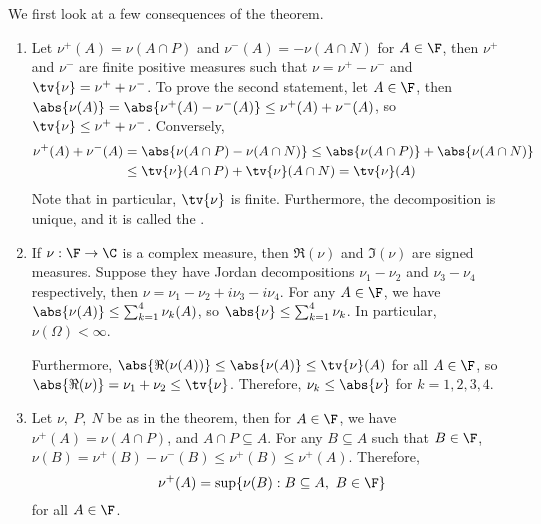 \documentclass[a4paper]{article}
\begin{document}
\begin{remark}
  We first look at a few consequences of the theorem.
	\begin{enumerate}[label=(\arabic*)]
		\item Let $\nu^+(A)=\nu(A\cap P)$ and $\nu^-(A)=-\nu(A\cap N)$ for $A\in\F$, then $\nu^+$ and $\nu^-$ are finite positive measures such that $\nu=\nu^+-\nu^-$ and $\tv{\nu}=\nu^+ +\nu^-$. To prove the second statement, let $A\in\F$, then $\abs{\nu(A)}=\abs{\nu^+(A)-\nu^-(A)}\leq\nu^+(A)+\nu^-(A)$, so $\tv{\nu}\leq\nu^++\nu^-$. Conversely,
		\begin{align*}
		 \nu^+(A)+\nu^-(A)&=\abs{\nu(A\cap P)-\nu(A\cap N)}\leq\abs{\nu(A\cap P)}+\abs{\nu(A\cap N)}\\
		 &\leq\tv{\nu}(A\cap P)+\tv{\nu}(A\cap N)=\tv{\nu}(A)
		\end{align*}
		Note that in particular, $\tv{\nu}$ is finite. Furthermore, the decomposition is unique, and it is called the .
		\item If $\nu:\F\to\C$ is a complex measure, then $\Re(\nu)$ and $\Im (\nu)$ are signed measures. Suppose they have Jordan decompositions $\nu_1-\nu_2$ and $\nu_3-\nu_4$ respectively, then $\nu=\nu_1-\nu_2+i\nu_3-i\nu_4$. For any $A\in\F$, we have $\abs{\nu(A)}\leq\sum_{k=1}^4\nu_k(A)$, so $\abs{\nu}\leq\sum_{k=1}^4\nu_k$. In particular, $\nu(\Omega)<\infty$.

		Furthermore, $\abs{\Re(\nu(A))}\leq\abs{\nu(A)}\leq\tv{\nu}(A)$ for all $A\in\F$, so $\abs{\Re(\nu)}=\nu_1+\nu_2\leq\tv{\nu}$. Therefore, $\nu_k\leq\abs{\nu}$ for $k=1,2,3,4$.
		\item Let $\nu,\ P,\ N$ be as in the theorem, then for $A\in\F$, we have $\nu^+(A)=\nu(A\cap P)$, and $A\cap P\subseteq A$. For any $B\subseteq A$ such that $B\in\F$, $\nu(B)=\nu^+(B)-\nu^-(B)\leq\nu^+(B)\leq\nu^+(A)$. Therefore,
		\[\nu^+(A)=\sup\{\nu(B):B\subseteq A,\ B\in\F\}\]
		for all $A\in\F$.
	\end{enumerate}
\end{remark}
\end{document}
